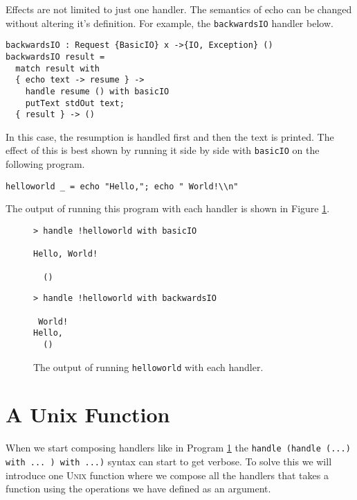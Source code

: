 \documentclass[logo,bsc,singlespacing,parskip]{infthesis}
\begin{document}
Effects are not limited to just one handler. The semantics of echo can be
changed without altering it's definition. For example, the \texttt{backwardsIO}
handler below.

\begin{lstlisting}[language=unison]
backwardsIO : Request {BasicIO} x ->{IO, Exception} () 
backwardsIO result =
  match result with
  { echo text -> resume } -> 
    handle resume () with basicIO 
    putText stdOut text;
  { result } -> ()
\end{lstlisting}

In this case, the resumption is handled first and then the text is printed. The
effect of this is best shown by running it side by side with \texttt{basicIO}
on the following program.

\begin{lstlisting}[language=unison]
helloworld _ = echo "Hello,"; echo " World!\\n"
\end{lstlisting}

The output of running this program with each handler is shown in Figure \ref{fig:sidebyside}.

\begin{figure}[h]
  \label{fig:sidebyside}
\begin{minipage}{0.5\textwidth}

\begin{lstlisting}[style=terminal]
> handle !helloworld with basicIO

Hello, World!

  ()
\end{lstlisting}

\end{minipage}%
\begin{minipage}{0.5\textwidth}

\begin{lstlisting}[style=terminal]
 > handle !helloworld with backwardsIO

 World!
Hello,
  ()
\end{lstlisting}
\end{minipage}
\caption{The output of running \texttt{helloworld} with each handler.}
\end{figure}

\section{A Unix Function}

When we start composing handlers like in Program \hyperref[prog:helloworld]{1}
the \texttt{handle (handle (...) with ... ) with ...)} syntax can start to get
verbose. To solve this we will introduce one \textsc{Unix} function where we
compose all the handlers that takes a function using the operations we have
defined as an argument.
\end{document}
